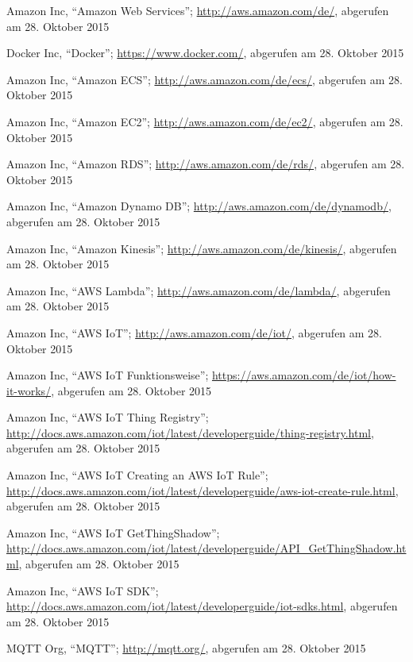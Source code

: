 \begin{thebibliography}{1}

Amazon Inc, ``Amazon Web Services''; \url{http://aws.amazon.com/de/}, abgerufen am 28. Oktober 2015

Docker Inc, ``Docker''; \url{https://www.docker.com/}, abgerufen am 28. Oktober 2015

Amazon Inc, ``Amazon ECS''; \url{http://aws.amazon.com/de/ecs/}, abgerufen am 28. Oktober 2015

Amazon Inc, ``Amazon EC2''; \url{http://aws.amazon.com/de/ec2/}, abgerufen am 28. Oktober 2015

Amazon Inc, ``Amazon RDS''; \url{http://aws.amazon.com/de/rds/}, abgerufen am 28.
Oktober 2015

Amazon Inc, ``Amazon Dynamo DB''; \url{http://aws.amazon.com/de/dynamodb/}, abgerufen am 28. Oktober 2015

Amazon Inc, ``Amazon Kinesis''; \url{http://aws.amazon.com/de/kinesis/}, abgerufen am 28. Oktober 2015

Amazon Inc, ``AWS Lambda''; \url{http://aws.amazon.com/de/lambda/}, abgerufen am 28. Oktober 2015

Amazon Inc, ``AWS IoT''; \url{http://aws.amazon.com/de/iot/}, abgerufen am 28. Oktober 2015


Amazon Inc, ``AWS IoT Funktionsweise''; \url{https://aws.amazon.com/de/iot/how-it-works/}, abgerufen am 28. Oktober 2015

Amazon Inc, ``AWS IoT Thing Registry''; \url{http://docs.aws.amazon.com/iot/latest/developerguide/thing-registry.html}, abgerufen am 28. Oktober 2015

Amazon Inc, ``AWS IoT Creating an AWS IoT Rule''; \url{http://docs.aws.amazon.com/iot/latest/developerguide/aws-iot-create-rule.html}, abgerufen am 28. Oktober 2015

Amazon Inc, ``AWS IoT GetThingShadow''; \url{http://docs.aws.amazon.com/iot/latest/developerguide/API_GetThingShadow.html}, abgerufen am 28. Oktober 2015

Amazon Inc, ``AWS IoT SDK''; \url{http://docs.aws.amazon.com/iot/latest/developerguide/iot-sdks.html}, abgerufen am 28. Oktober 2015

MQTT Org, ``MQTT''; \url{http://mqtt.org/}, abgerufen am 28. Oktober 2015


\end{thebibliography}
